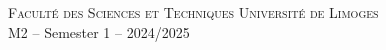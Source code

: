 \documentclass[11pt,a4paper]{article}
\begin{document}
\thispagestyle{empty}

\begin{center}

    \textsc{Facult\'e des Sciences et Techniques}  \hfill \textsc{Universit\'e de Limoges} \\
    \hfill M2 -- Semester 1 -- 2024/2025 \\
    \bigskip

\end{center}



\end{document}
